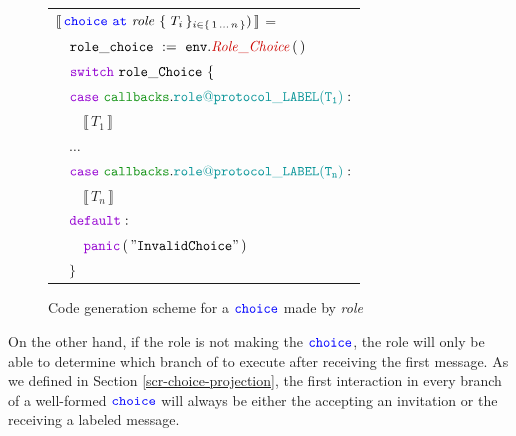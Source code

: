 \documentclass[12pt,twoside]{report}
\begin{document}
\begin{figure}[!h]
    \begin{center}
        \begin{tabular}{l}
            $\llbracket\,{\color{blue}\mathtt{choice}}\ {\color{blue}\mathtt{at}}\ \mathit{role}\ \{\,\mathit{T}_{i}\,\}_{{i \in \{\,1\,\dots\,n\,\}}})\,\rrbracket$ =\\[10pt]
            
            $\quad \assignment{role\_choice}{\methodcall{\envparam}{Role\_Choice}\,\emptyparams}$\\[3pt]
            
            $\quad \goswitch\ \varname{role\_Choice}\ \{$\\[3pt]

            $\quad \gocase\ \pkgenumaccess{callbacks}{\localprotocol{role}{protocol}\_LABEL(T_1)}:$\\[3pt]

            $\qquad \llbracket\,T_1\,\rrbracket$\\[6pt]

            $\quad \dots$\\[9pt]
            
            $\quad \gocase\ \pkgenumaccess{callbacks}{\localprotocol{role}{protocol}\_LABEL(T_n)}:$\\[3pt]

            $\qquad \llbracket\,T_n\,\rrbracket$\\[6pt]

            $\quad \godefault:$\\[3pt]

            $\qquad \gopanic\,(\,\mathtt{"Invalid Choice"}\,)$\\[3pt]

            $\quad \}$\\
        \end{tabular}
    \end{center}
    \caption{Code generation scheme for a ${\color{blue}\mathtt{choice}}$ made by \textit{role}}
    \label{role-makes-choice-codegen}
\end{figure}

On the other hand, if the role is not making the ${\color{blue}\mathtt{choice}}$, the role will only be able to determine which branch of to execute after receiving the first message. As we defined in Section \ref{scr-choice-projection}, the first interaction in every branch of a well-formed ${\color{blue}\mathtt{choice}}$ will always be either the accepting an invitation or the receiving a labeled message.\\
\end{document}

